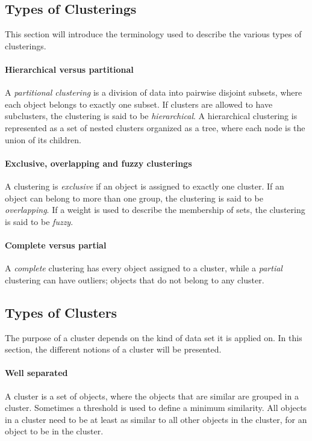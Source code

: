 \subsection{Types of Clusterings}
This section will introduce the terminology used to describe the various types of clusterings. 

\paragraph{Hierarchical versus partitional}
A \textit{partitional clustering} is a division of data into pairwise disjoint subsets, where each object belongs to exactly one subset.
If clusters are allowed to have subclusters, the clustering is said to be \textit{hierarchical}.
A hierarchical clustering is represented as a set of nested clusters organized as a tree, where each node is the union of its children.

\paragraph{Exclusive, overlapping and fuzzy clusterings}

A clustering is \textit{exclusive} if an object is assigned to exactly one cluster.
If an object can belong to more than one group, the clustering is said to be \textit{overlapping}.
If a weight is used to describe the membership of sets, the clustering is said to be \textit{fuzzy}.

\paragraph{Complete versus partial}

A \textit{complete} clustering has every object assigned to a cluster, while a \textit{partial} clustering can have outliers; objects that do not belong to any cluster.

\subsection{Types of Clusters}
The purpose of a cluster depends on the kind of data set it is applied on.
In this section, the different notions of a cluster will be presented.

\paragraph{Well separated}
A cluster is a set of objects, where the objects that are similar are grouped in a cluster. 
Sometimes a threshold is used to define a minimum similarity. 
All objects in a cluster need to be at least as similar to all other objects in the cluster, for an object to be in the cluster.

